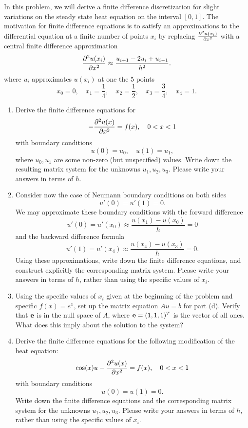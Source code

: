 
In this problem, we will derive a finite difference discretization for slight variations on the steady state heat equation on the interval $[0,1]$.  The motivation for finite difference equations is to satisfy an approximations to the differential equation at a finite number of points $x_i$ by replacing $\frac{\partial^{2} u(x_i)}{\partial x^{2}}$ with a central finite difference approximation
\[
\frac{\partial^{2} u(x_i)}{\partial x^{2}} \approx \frac{ u_{i+1} - 2u_i + u_{i-1}}{h^2}.
\]
where $u_i$ approximates $u(x_i)$ at one the 5 points 
\[
x_0 = 0, \quad x_1 = \frac{1}{4}, \quad x_2 = \frac{1}{2}, \quad x_3 = \frac{3}{4}, \quad x_4 = 1.
\]
\begin{enumerate}
\item Derive the finite difference equations for 
\[
- \frac{\partial^{2} u(x)}{\partial x^{2}} = f(x), \quad 0<x<1
\]
with boundary conditions 
\[
u(0) = u_0, \quad u(1) = u_1,
\]
where $u_0, u_1$ are some non-zero (but unspecified) values.  Write down the resulting matrix system for the unknowns $u_1, u_2, u_3$.  Please write your answers in terms of $h$.
\vspace{1em}
\item Consider now the case of Neumann boundary conditions on both sides
\[
u'(0) = u'(1) = 0.
\]
We may approximate these boundary conditions with the forward difference
\[
u'(0) = u'(x_0) \approx \frac{u(x_1)-u(x_0)}{h} = 0
\]
and the backward difference formula
\[
u'(1) = u'(x_{4}) \approx \frac{u(x_{4})-u(x_3)}{h} = 0.
\]
Using these approximations, write down the finite difference equations, and construct explicitly the corresponding matrix system.  Please write your answers in terms of $h$, rather than using the specific values of $x_i$.
\item Using the specific values of $x_i$ given at the beginning of the problem and specific $f(x) = e^x$, set up the matrix equation $Au=b$ for part (d).  Verify that ${\bf e}$ is in the null space of ${A}$, where ${\bf e} = (1,1,1)^T$ is the vector of all ones.  What does this imply about the solution to the system?  
\vspace{1em}
\item Derive the finite difference equations for the following modification of the heat equation:
\[
\cos(x) u - \frac{\partial^{2} u(x)}{\partial x^{2}} = f(x), \quad 0<x<1
\]
with boundary conditions 
\[
u(0) = u(1) = 0.
\]
Write down the finite difference equations and the corresponding matrix system for the unknowns $u_1, u_2, u_3$.  Please write your answers in terms of $h$, rather than using the specific values of $x_i$.


\end{enumerate}



